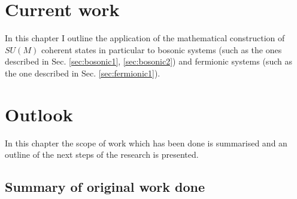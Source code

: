 \documentclass[12pt]{report}
\begin{document}
	
	
	
	
	
	
	
	
	
	
	
	
	
	
	\chapter{Current work}
	In this chapter I outline the application of the mathematical construction of $SU(M)$ coherent states in particular to bosonic systems (such as the ones described in Sec. \ref{sec:bosonic1}, \ref{sec:bosonic2}) and fermionic systems (such as the one described in Sec. \ref{sec:fermionic1}).
	
	
	
	
	
	
	
	
	
	\chapter{Outlook}
	
	In this chapter the scope of work which has been done is summarised and an outline of the next steps of the research is presented.
	
	\section{Summary of original work done}
	
\end{document}
